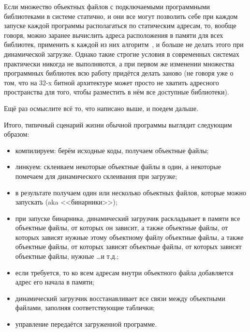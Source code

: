 Если множество объектных файлов с подключаемыми программными библиотеками в системе статично, и они все могут позволить себе при каждом запуске каждой программы располагаться по статическим адресам, то, вообще говоря, можно заранее вычислить адреса расположения в памяти для всех библиотек, применить к каждой из них алгоритм~, и больше не делать этого при динамической загрузке.
Однако такие строгие условия в современных системах практически никогда не выполняются, а при первом же изменении множества программных библиотек всю работу придётся делать заново (не говоря уже о том, что на 32-x битной архитектуре может просто не хватить адресного  пространства для того, чтобы разместить в нём все доступные библиотеки).

Ещё раз осмыслите всё то, что написано выше, и поедем дальше.

Итого, типичный сценарий жизни обычной программы выглядит следующим образом:
\begin{itemize}
    \item компилируем: берём исходные коды, получаем объектные файлы;
    \item линкуем: склеиваем некоторые объектные файлы в один, а некоторые помечаем для динамического склеивания при загрузке;
    \item в результате получаем один или несколько объектных файлов, которые можно запускать (aka <<бинарники>>);
    \item при запуске бинарника, динамический загрузчик раскладывает в памяти все объектные файлы, от которых он зависит, а также объектные файлы, от которых зависят нужные этому объектному файлу объектные файлы, а также объектные файлы, от которых зависят объектные файлы, от которых зависят объектные файлы, нужные \dots и т.д.;
    \item если требуется, то ко всем адресам внутри объектного файла добавляется адрес его начала в памяти;
    \item динамический загрузчик восстанавливает все связи между объектными файлами, заполняя соответствующие таблички;
    \item управление передаётся загруженной программе.
\end{itemize}

